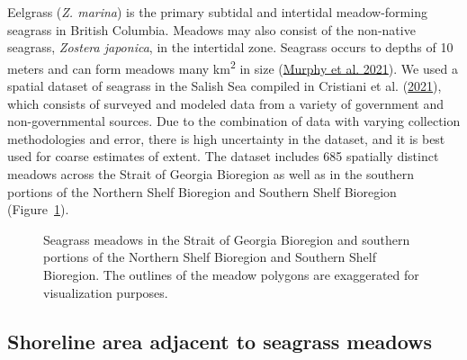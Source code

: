\documentclass[12pt]{article}\usepackage[]{graphicx}\usepackage[]{color}
\begin{document}
Eelgrass (\emph{Z. marina}) is the primary subtidal and intertidal meadow-forming seagrass in British Columbia. Meadows may also consist of the non-native seagrass, \emph{Zostera japonica}, in the intertidal zone. Seagrass occurs to depths of 10 meters and can form meadows many km\textsuperscript{2} in size (\protect\hyperlink{ref-Murphy2021a}{Murphy et al. 2021}). We used a spatial dataset of seagrass in the Salish Sea compiled in Cristiani et al. (\protect\hyperlink{ref-Cristiani2021}{2021}), which consists of surveyed and modeled data from a variety of government and non-governmental sources. Due to the combination of data with varying collection methodologies and error, there is high uncertainty in the dataset, and it is best used for coarse estimates of extent. The dataset includes 685 spatially distinct meadows across the Strait of Georgia Bioregion as well as in the southern portions of the Northern Shelf Bioregion and Southern Shelf Bioregion (Figure~\ref{fig:studyareafig}).
\begin{figure}[H]

{\centering {} 

}

\caption{Seagrass meadows in the Strait of Georgia Bioregion and southern portions of the Northern Shelf Bioregion and Southern Shelf Bioregion. The outlines of the meadow polygons are exaggerated for visualization purposes.}\label{fig:studyareafig}
\end{figure}
\hypertarget{shoreline-area-adjacent-to-seagrass-meadows}{%
\subsection{Shoreline area adjacent to seagrass meadows}\label{shoreline-area-adjacent-to-seagrass-meadows}}
\end{document}
